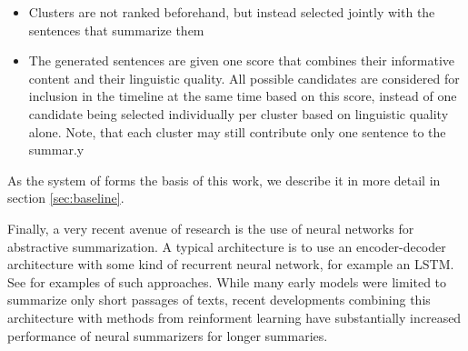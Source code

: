 \documentclass[a4paper,BCOR=10mm]{report}
\numberwithin{lemma}{chapter}
\numberwithin{definition}{chapter}
\begin{document}
\begin{itemize}
    \item{Clusters are not ranked beforehand, but instead selected jointly with the sentences that summarize them}
    \item{The generated sentences are given one score that combines their informative content and their linguistic quality. All possible candidates are considered for inclusion in the timeline at the same time based on this score, instead of one candidate being selected individually per cluster based on linguistic quality alone. Note, that each cluster may still contribute only one sentence to the summar.y}
\end{itemize}

As the system of \citet{banerjee} forms the basis of this work, we describe it in more detail in section \ref{sec:baseline}.



%


Finally, a very recent avenue of research is the use of neural networks for abstractive summarization. A typical architecture is to use an encoder-decoder architecture with some kind of recurrent neural network, for example an LSTM. See \citet{nallapati, rush} for examples of such approaches.
While many early models were limited to summarize only short passages of texts, recent developments combining this architecture with methods from reinforment learning have substantially increased performance of neural summarizers for longer summaries. \citet{paulus}
\end{document}
